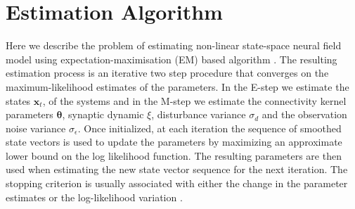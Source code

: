 \documentclass[]{article}
\begin{document}
\section{Estimation Algorithm}
Here we describe the problem of estimating non-linear state-space neural field model using expectation-maximisation (EM) based algorithm \cite{Dempster1977,Shumway2000}. The resulting estimation process is an iterative two step procedure that converges on the maximum-likelihood estimates of the parameters. In the E-step we estimate the states $\mathbf x_t$, of the systems and in the M-step we estimate the connectivity kernel parameters $\boldsymbol \theta$, synaptic dynamic $\xi$, disturbance variance $\sigma_d$ and the observation noise variance $\sigma_{\epsilon}$. Once initialized, at each iteration the sequence of smoothed state vectors is used to update the parameters by maximizing an approximate lower bound on the log likelihood function. The resulting parameters are then used when estimating the new
state vector sequence for the next iteration. The stopping criterion is usually associated with either the change in the parameter estimates or the log-likelihood variation \cite{McLachlan1997}.
\end{document}
